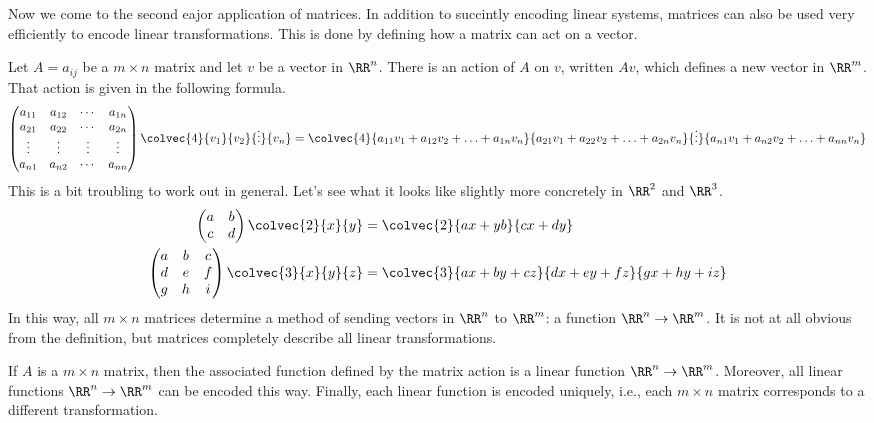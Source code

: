 \documentclass[fleqn]{report}
\begin{document}
Now we come to the second eajor application of matrices. In
addition to succintly encoding linear systems, matrices can
also be used very efficiently to encode linear
transformations. This is done by defining how a matrix can act
on a vector.

\begin{defn}
Let $A = a_{ij}$ be a $m \times n$ matrix and let $v$ be a
vector in $\RR^n$. There is an action of $A$ on $v$, written
$Av$, which defines a new vector in $\RR^m$. That action is
given in the following formula.
\begin{displaymath}
\left( 
\begin{matrix}
a_{11} & a_{12} & \cdots & a_{1n} \\
a_{21} & a_{22} & \cdots & a_{2n} \\
\vdots & \vdots & \vdots & \vdots \\
a_{n1} & a_{n2} & \cdots & a_{nn} 
\end{matrix}
\right)
\colvec{4}{v_1}{v_2}{\vdots}{v_n}
= 
\colvec{4}
{a_{11}v_1 + a_{12}v_2 + \ldots + a_{1n}v_n} 
{a_{21}v_1 + a_{22}v_2 + \ldots + a_{2n}v_n} 
{\vdots}
{a_{n1}v_1 + a_{n2}v_2 + \ldots + a_{nn}v_n} 
\end{displaymath}
This is a bit troubling to work out in general. Let's see
what it looks like slightly more concretely in $\RR^2$ and
$\RR^3$.
\begin{align*}
\left( 
\begin{matrix}
a & b \\
c & d 
\end{matrix}
\right)
\colvec{2}{x}{y} 
& = 
\colvec{2}{ax + yb}{cx + dy} \\
\left( 
\begin{matrix}
a & b & c \\
d & e & f \\
g & h & i 
\end{matrix}
\right)
\colvec{3}{x}{y}{z} 
& = 
\colvec{3}
{ax + by + cz}{dx + ey + fz}{gx + hy + iz}
\end{align*}
In this way, all $m \times n$ matrices determine a
method of sending vectors in $\RR^n$ to $\RR^m$: a
function $\RR^n \rightarrow \RR^m$. It is not at all obvious
from the definition, but matrices completely describe all
linear transformations.
\end{defn}

\begin{prop}
If $A$ is a $m \times n$ matrix, then the associated function
defined by the matrix action is a linear function $\RR^n
\rightarrow \RR^m$. Moreover, all linear functions $\RR^n
\rightarrow \RR^m$ can be encoded this way. Finally, each
linear function is encoded uniquely, i.e., each $m \times n$
matrix corresponds to a different transformation.
\end{prop}
\end{document}
